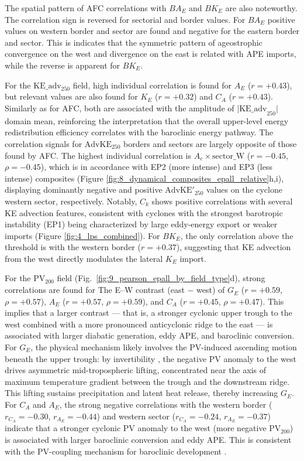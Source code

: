 \documentclass[pdflatex,sn-chicago]{sn-jnl}%
\theoremstyle{plain}
\theoremstyle{definition}
\theoremstyle{remark}
\theoremstyle{definition}
\begin{document}
The spatial pattern of AFC correlations with $BA_E$ and $BK_E$ are also noteworthy. The correlation sign is reversed for sectorial and border values. For $BA_E$ positive values on western border and sector are found and negative for the eastern border and sector. This is indicates that the symmetric pattern of ageostrophic convergence on the west and divergence on the east is related with APE imports, while the reverse is apparent for $BK_E$.

For the $\mathrm{KE\_adv}_{250}$ field, high individual correlation is found for $A_E$  ($r = +0.43$), but relevant values are also found for $K_E$ ($r = +0.32$) and $C_A$ ($r = +0.43$). Similarly as for AFC, both are associated with the amplitude of $\mathrm{|KE\_adv}_{250}|$ domain mean, reinforcing the interpretation that the overall upper-level energy redistribution efficiency correlates with the baroclinic energy pathway.
The correlation signals for $\mathrm{AdvKE}_{250}$ borders and sectors are largely opposite of those found by AFC.
The highest individual correlation is $A_e \times \mathrm{sector\_W}$ ($r = -0.45$, $\rho = -0.45$), which is in accordance with EP2 (more intense) and EP3 (less intense) composites (Figure \ref{fig:8_dynamical_composites_epall_relative}h,i), displaying dominantly negative and positive $\mathrm{AdvKE'}_{250}$ values on the cyclone western sector, respectively. Notably, $C_k$ shows positive correlations with several KE advection features, consistent with cyclones with the strongest barotropic instability (EP1) being characterized by large eddy-energy export or weaker imports (Figure \ref{fig:4_lps_combined}). For $BK_E$, the only correlation above the threshold is with the western border ($r = +0.37$), suggesting that KE advection from the west directly modulates the lateral $K_E$ import.

For the $\mathrm{PV}_{200}$ field (Fig.~\ref{fig:9_pearson_epall_by_field_type}d), strong correlations are found for The E–W contrast (east $-$ west) of $G_E$ ($r = +0.59$, $\rho = +0.57$), $A_E$ ($r = +0.57$, $\rho = +0.59$), and $C_A$ ($r = +0.45$, $\rho = +0.47$). This implies that a larger contrast — that is, a stronger cyclonic upper trough to the west combined with a more pronounced anticyclonic ridge to the east — is associated with larger diabatic generation, eddy APE, and baroclinic conversion. For $G_E$, the physical mechanism likely involves the PV-induced ascending motion beneath the upper trough: by invertibility \citep{hoskins1985use}, the negative PV anomaly to the west drives asymmetric mid-tropospheric lifting, concentrated near the axis of maximum temperature gradient between the trough and the downstream ridge. This lifting sustains precipitation and latent heat release, thereby increasing $G_E$. For $C_A$ and $A_E$, the strong negative correlations with the western border
($r_{C_A} = -0.30$, $r_{A_E} = -0.44$) and western sector ($r_{C_A} = -0.24$, $r_{A_E} = -0.37$) indicate that a stronger cyclonic PV anomaly to the west (more negative $\mathrm{PV}_{200}$) is associated with larger baroclinic conversion and eddy APE. This is consistent with the PV-coupling mechanism for baroclinic development \citep{hoskins1985use,davis1991potential}.
\end{document}
